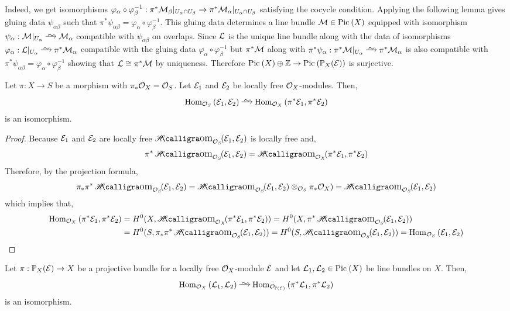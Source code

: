 \documentclass[12pt]{article}
\begin{document}
\begin{enumerate}
Indeed, we get isomorphisms $\varphi_\alpha \circ \varphi_\beta^{-1} : \pi^* \mathcal{M}_\beta|_{U_\alpha \cap U_\beta} \to \pi^* \mathcal{M}_\alpha |_{U_\alpha \cap U_\beta}$ satisfying the cocycle condition. Applying the following lemma gives gluing data $\psi_{\alpha \beta}$ such that $\pi^* \psi_{\alpha \beta} = \varphi_\alpha \circ \varphi_\beta^{-1}$.  This gluing data determines a line bundle $\mathcal{M} \in \mathrm{Pic}^{} \left( X \right)$ equipped with isomorphism $\psi_\alpha : \M|_{U_\alpha} \iso \M_\alpha$ compatible with $\psi_{\alpha \beta}$ on overlaps. Since $\mathcal{L}$ is the unique line bundle along with the data of isomorphisms $\varphi_\alpha : \L|_{U_\alpha} \iso \pi^* \M_\alpha$ compatible with the gluing data $\varphi_\alpha \circ \varphi_\beta^{-1}$ but $\pi^* \mathcal{M}$ along with $\pi^* \psi_\alpha : \pi^* \M |_{U_\alpha} \iso \pi^* \M_\alpha$ is also compatible with $\pi^* \psi_{\alpha \beta} = \varphi_\alpha \circ \varphi_\beta^{-1}$ showing that $\mathcal{L} \cong \pi^* \mathcal{M}$ by uniqueness. Therefore $\mathrm{Pic}^{} \left( X \right) \oplus \mathbb{Z} \to \mathrm{Pic}^{} \left( \mathbb{P}_X(\mathcal{E}) \right)$ is surjective.

\begin{lemma}
Let $\pi : X \to S$ be a morphism with $\pi_* \mathcal{O}_{X} = \mathcal{O}_{S}$. Let $\mathcal{E}_1$ and $\mathcal{E}_2$ be locally free $\mathcal{O}_{X}$-modules. Then,
\[ \Hom{\struct{S}}{\E_1}{\E_2} \iso \Hom{\struct{X}}{\pi^* \E_1}{\pi^* \E_2} \]
is an isomorphism. 
\end{lemma}

\begin{proof}
Because $\mathcal{E}_1$ and $\mathcal{E}_2$ are locally free $\shHom{\struct{S}}{\E_1}{\E_2}$ is locally free and,
\[ \pi^* \shHom{\struct{S}}{\E_1}{\E_2} = \shHom{\struct{X}}{\pi^*\E_1}{\pi^* \E_2} \]
Therefore, by the projection formula,
\[ \pi_* \pi^* \shHom{\struct{S}}{\E_1}{\E_2} = \shHom{\struct{S}}{\E_1}{\E_2} \ot_{\struct{S}} \pi_* \struct{X}) = \shHom{\struct{S}}{\E_1}{\E_2} \]
which implies that,
\begin{align*}
\Hom{\struct{X}}{\pi^* \E_1}{\pi^* \E_2} & = H^0(X, \shHom{\struct{X}}{\pi^*\E_1}{\pi^* \E_2}) = H^0(X, \pi^* \shHom{\struct{S}}{\E_1}{\E_2}) 
\\
& = H^0(S, \pi_* \pi^* \shHom{\struct{S}}{\E_1}{\E_2}) = H^0(S, \shHom{\struct{S}}{\E_1}{\E_2}) = \Hom{\struct{S}}{\E_1}{\E_2} 
\end{align*}
\end{proof}

\begin{cor}
Let $\pi : \mathbb{P}_X(\mathcal{E}) \to X$ be a projective bundle for a locally free $\mathcal{O}_{X}$-module $\mathcal{E}$ and let $\mathcal{L}_1, \mathcal{L}_2 \in \mathrm{Pic}^{} \left( X \right)$ be line bundles on $X$. Then,
\[ \Hom{\struct{X}}{\L_1}{\L_2} \iso \Hom{\struct{\P(\E)}}{\pi^* \L_1}{\pi^* \L_2} \]
is an isomorphism. 
\end{cor}


\end{enumerate}
\end{document}
